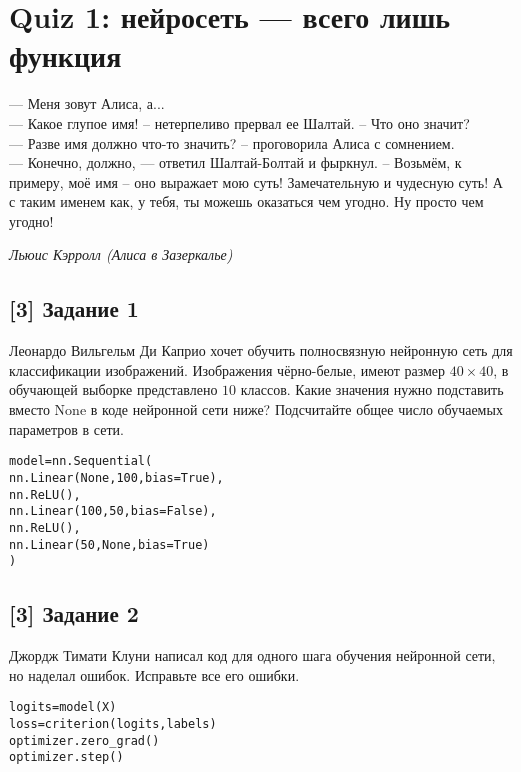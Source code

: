 \documentclass[12pt, a4paper, oneside]{article}
\begin{document}
\section*{Quiz 1: нейросеть --- всего лишь функция}

\epigraph{
— Меня зовут Алиса, а... \\ 
— Какое глупое имя! – нетерпеливо прервал ее Шалтай. – Что оно значит? \\
— Разве имя должно что-то значить? – проговорила Алиса с сомнением. \\ 
— Конечно, должно, — ответил Шалтай-Болтай и фыркнул. – Возьмём, к примеру, моё имя – оно выражает мою суть! Замечательную и чудесную суть! А с таким именем как, у тебя, ты можешь оказаться чем угодно. Ну просто чем угодно!
}{\textit{Льюис Кэрролл (Алиса в Зазеркалье)}}

\vspace{-0.5cm}
\subsection*{[3] Задание 1} 
\vspace{-0.5cm}

Леонардо Вильгельм Ди Каприо хочет обучить полносвязную нейронную сеть для классификации изображений. Изображения чёрно-белые, имеют размер $40 \times 40$, в обучающей выборке представлено $10$ классов. Какие значения нужно подставить вместо None в коде нейронной сети ниже? Подсчитайте общее число обучаемых параметров в сети. 

\begin{alltt}
model = nn.Sequential(
    nn.Linear(None, 100, bias=True), 
    nn.ReLU(),
    nn.Linear(100, 50, bias=False), 
    nn.ReLU(),
    nn.Linear(50, None, bias=True)
)
\end{alltt}

\vspace{-1cm}
\subsection*{[3] Задание 2}
\vspace{-0.5cm}

Джордж Тимати Клуни написал код для одного шага обучения нейронной сети, но наделал ошибок. Исправьте все его ошибки.
\begin{alltt}
    logits = model(X)
    loss = criterion(logits, labels)
    optimizer.zero\_grad()
    optimizer.step()
\end{alltt}
\end{document}
